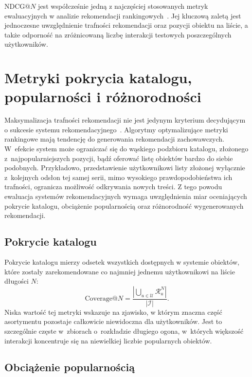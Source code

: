$\text{NDCG}@N$ jest współcześnie jedną z najczęściej stosowanych metryk ewaluacyjnych w analizie rekomendacji rankingowych~\cite{ricci2015recommender,kang2018self,sun2019bert4rec}. Jej kluczową zaletą jest jednoczesne uwzględnienie trafności rekomendacji oraz pozycji obiektu na liście, a także odporność na zróżnicowaną liczbę interakcji testowych poszczególnych użytkowników.

\section{Metryki pokrycia katalogu, popularności i różnorodności}

Maksymalizacja trafności rekomendacji nie jest jedynym kryterium decydującym o sukcesie systemu rekomendacyjnego~\cite{kaminskas2016diversity}. Algorytmy optymalizujące metryki rankingowe mają tendencję do generowania rekomendacji zachowawczych. W~efekcie system może ograniczać się do wąskiego podzbioru katalogu, złożonego z~najpopularniejszych pozycji, bądź oferować listę obiektów bardzo do siebie podobnych. Przykładowo, przedstawienie użytkownikowi listy złożonej wyłącznie z~kolejnych odsłon tej samej serii, mimo wysokiego prawdopodobieństwa ich trafności, ogranicza możliwość odkrywania nowych treści. Z tego powodu ewaluacja systemów rekomendacyjnych wymaga uwzględnienia miar oceniających pokrycie katalogu, obciążenie popularnością oraz różnorodność wygenerowanych rekomendacji.

\subsection{Pokrycie katalogu}

Pokrycie katalogu mierzy odsetek wszystkich dostępnych w systemie obiektów, które zostały zarekomendowane co najmniej jednemu użytkownikowi na liście długości $N$:
\begin{equation}
    \text{Coverage}@N = \frac{\left| \bigcup_{u \in \mathcal{U}} \mathcal{R}_u^N \right|}{|\mathcal{I}|}.
\end{equation}
Niska wartość tej metryki wskazuje na zjawisko, w którym znaczna część asortymentu pozostaje całkowicie niewidoczna dla użytkowników. Jest to szczególnie częste w~zbiorach o~rozkładzie długiego ogona, w~których większość interakcji koncentruje się na niewielkiej liczbie popularnych obiektów.

\subsection{Obciążenie popularnością}

